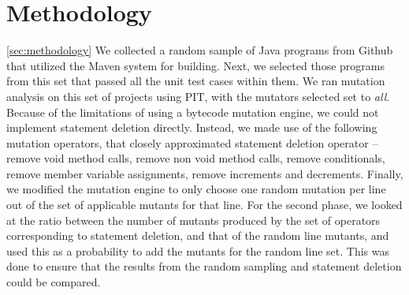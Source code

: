 \section{Methodology}
\ref{sec:methodology}
We collected a random sample of Java programs from Github\cite{github} that utilized the Maven\cite{maven} system for building. Next, we selected those programs from this set that passed all the unit test cases within them. We ran mutation analysis on this set of projects using PIT\cite{pitest}, with the mutators selected set to {\it all}. Because of the limitations of using a bytecode mutation engine, we could not implement statement deletion directly. Instead, we made use of the following mutation operators, that closely approximated statement deletion operator -- remove void method calls, remove non void method calls, remove conditionals, remove member variable assignments, remove increments and decrements. Finally, we modified the mutation engine to only choose one random mutation per line out of the set of applicable mutants for that line. For the second phase, we looked at the ratio between the number of mutants produced by the set of operators corresponding to statement deletion, and that of the random line mutants, and used this as a probability to add the mutants for the random line set. This was done to ensure that the results from the random sampling and statement deletion could be compared.
